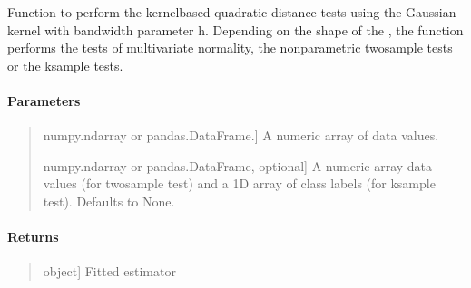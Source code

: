 \documentclass[letterpaper,10pt,english,openany,oneside]{sphinxmanual}
\begin{document}
\begin{fulllineitems}
\label{\detokenize{api_reference/generated/QuadratiK.kernel_test.KernelTest:QuadratiK.kernel_test.KernelTest.test}}
\pysigstartsignatures
{}
\pysigstopsignatures
\sphinxAtStartPar
Function to perform the kernel\sphinxhyphen{}based quadratic distance tests using 
the Gaussian kernel with bandwidth parameter h. 
Depending on the shape of the , the function performs the tests of 
multivariate normality, the non\sphinxhyphen{}parametric two\sphinxhyphen{}sample tests or the k\sphinxhyphen{}sample tests.


\paragraph{Parameters}
\label{\detokenize{api_reference/generated/QuadratiK.kernel_test.KernelTest:id3}}\begin{quote}
\begin{description}
\sphinxlineitem{x}{[}numpy.ndarray or pandas.DataFrame.{]}
\sphinxAtStartPar
A numeric array of data values.

\sphinxlineitem{y}{[}numpy.ndarray or pandas.DataFrame, optional{]}
\sphinxAtStartPar
A numeric array data values (for two\sphinxhyphen{}sample test) and a 1D array of class labels 
(for k\sphinxhyphen{}sample test). Defaults to None.

\end{description}
\end{quote}


\paragraph{Returns}
\label{\detokenize{api_reference/generated/QuadratiK.kernel_test.KernelTest:id4}}\begin{quote}
\begin{description}
\sphinxlineitem{self}{[}object{]}
\sphinxAtStartPar
Fitted estimator

\end{description}
\end{quote}

\end{fulllineitems}




\sphinxstepscope
\end{document}
